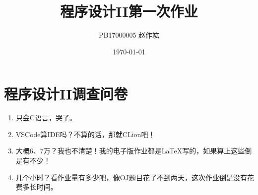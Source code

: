 \documentclass[UTF8,zihao=-4]{ctexart}
\title{\heiti 程序设计II\quad 第一次作业}
\author{PB17000005\quad \CJKfontspec{AR PL UKai CN} 赵作竑}
\date{\kaishu \today}
\begin{document}
    \maketitle
    \section*{程序设计II调查问卷}
    \begin{enumerate}
        \item 只会C语言，哭了。
        \item VSCode算IDE吗？不算的话，那就CLion吧！
        \item 大概6、7万？我也不清楚！我的电子版作业都是\LaTeX 写的，如果算上这些倒是有不少！
        \item 几个小时？看作业量有多少吧，像OJ题目花了不到两天，这次作业倒是没有花费多长时间。
    \end{enumerate}
\end{document}
